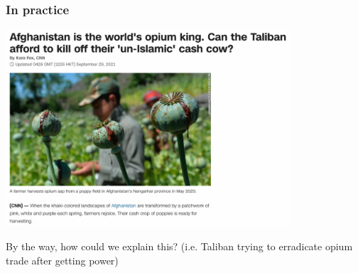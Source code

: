\documentclass[utf8, xcolor=dvipsnames]{beamer}
\begin{document}
\begin{frame}
\frametitle{In practice}
\centering

\includegraphics[width = 0.8\textwidth]{img/taliban_cnn}

By the way, how could we explain this? (i.e. Taliban trying to erradicate opium trade after getting power)

\end{frame}
\end{document}
